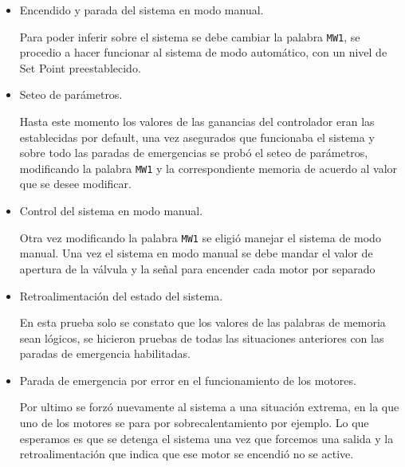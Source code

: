 \begin{itemize}
 \item Encendido y parada del sistema en modo manual.
 
 Para poder inferir sobre el sistema se debe cambiar la palabra \verb|MW1|, se procedio a
 hacer funcionar al sistema de modo automático, con un nivel de Set Point preestablecido.
 
 \item Seteo de parámetros.
 
 Hasta este momento los valores de las ganancias del controlador eran las establecidas por 
 default, una vez asegurados que funcionaba el sistema y sobre todo las paradas de emergencias
 se probó el seteo de parámetros, modificando la palabra \verb|MW1| y la correspondiente 
 memoria de acuerdo al valor que se desee modificar.
 
 \item Control del sistema en modo manual.
 
 Otra vez modificando la palabra \verb|MW1| se eligió manejar el sistema de modo manual.
 Una vez el sistema en modo manual se debe mandar el valor de apertura de la válvula y 
 la señal para encender cada motor por separado
 
 \item Retroalimentación del estado del sistema.
 
 En esta prueba solo se constato que los valores de las palabras de memoria sean lógicos,
 se hicieron pruebas de todas las situaciones anteriores con las paradas de emergencia 
 habilitadas.
 
 \item Parada de emergencia por error en el funcionamiento de los motores.
 
 Por ultimo se forzó nuevamente al sistema a una situación extrema, en la que uno
 de los motores se para por sobrecalentamiento por ejemplo. Lo que esperamos es que se
 detenga el sistema una vez que forcemos una salida y la retroalimentación que indica que
 ese motor se encendió no se active.
 
\end{itemize}

